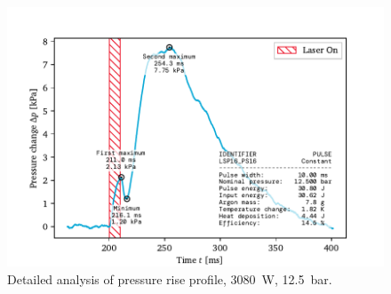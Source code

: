     \begin{figure}[h]
        \centering
        \includegraphics[]{assets/5 results/pressure_an_LSP16_PS16.pdf}
        \caption[Detailed analysis of pressure rise profile]{Detailed analysis of pressure rise profile, \qty{3080}{W}, \qty{12.5}{bar}.}
        \label{fig:}
    \end{figure}